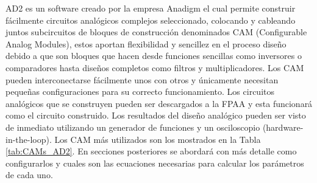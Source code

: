 	AD2 es un software creado por la empresa Anadigm el cual permite construir fácilmente circuitos analógicos complejos seleccionado, colocando y cableando juntos subcircuitos de bloques de construcción  denominados CAM (Configurable Analog Modules), estos aportan flexibilidad y sencillez en el proceso diseño debido a que son bloques que hacen desde funciones sencillas como inversores o comparadores hasta diseños completos como filtros y multiplicadores. Los CAM pueden interconectarse fácilmente unos con otros y únicamente necesitan pequeñas configuraciones para su correcto funcionamiento. Los circuitos analógicos que se construyen pueden ser descargados a la FPAA y esta funcionará como el circuito construido. Los resultados del diseño analógico pueden ser visto de inmediato utilizando un generador de funciones y un osciloscopio (hardware-in-the-loop). Los CAM más utilizados son los mostrados en la Tabla \ref{tab:CAMs_AD2}. En secciones posteriores se abordará con más detalle como configurarlos y cuales son las ecuaciones necesarias para calcular los parámetros de cada uno.  
	
